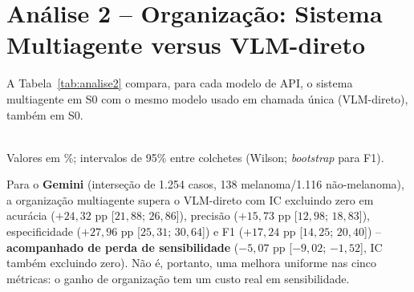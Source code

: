 \section{Análise 2 -- Organização: Sistema Multiagente versus VLM-direto}
\label{sec:resultados_analise2}

A Tabela~\ref{tab:analise2} compara, para cada modelo de API, o sistema multiagente em S0 com o mesmo modelo usado em chamada única (VLM-direto), também em S0.

\begin{table}[H]
	\centering
	\caption{Análise 2 -- multiagente (S0) versus VLM-direto (S0), por modelo, 3.000 lesões.}
	\label{tab:analise2}
	\\ \footnotesize Valores em \%; intervalos de 95\% entre colchetes (Wilson; \textit{bootstrap} para F1).
\end{table}

Para o \textbf{Gemini} (interseção de 1.254 casos, 138 melanoma/1.116 não-melanoma), a organização multiagente supera o VLM-direto com IC excluindo zero em acurácia ($+24,32$ pp [$21,88$; $26,86$]), precisão ($+15,73$ pp [$12,98$; $18,83$]), especificidade ($+27,96$ pp [$25,31$; $30,64$]) e F1 ($+17,24$ pp [$14,25$; $20,40$]) -- \textbf{acompanhado de perda de sensibilidade} ($-5,07$ pp [$-9,02$; $-1,52$], IC também excluindo zero). Não é, portanto, uma melhora uniforme nas cinco métricas: o ganho de organização tem um custo real em sensibilidade.

